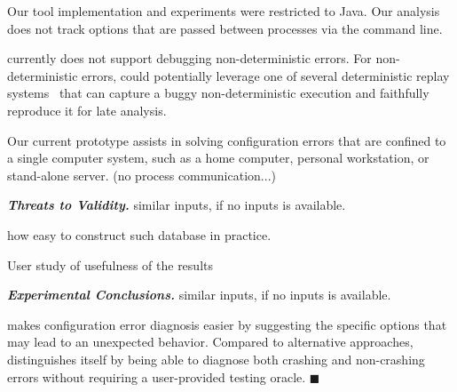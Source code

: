 Our tool implementation and experiments were restricted to Java. Our analysis
does not track options that are passed between processes via the command line.

\ourtool currently does not support debugging non-deterministic errors. %
For non-deterministic errors, \ourtool could potentially leverage one of
several deterministic replay systems~\cite{Huang:2010:LLD}
that can capture a buggy non-deterministic
execution and faithfully reproduce it for late analysis.

Our current \ourtool prototype assists in solving configuration errors that are confined
to a single computer system, such as a home computer, personal workstation, or stand-alone server. (no process communication...)

\vspace{1mm}

\noindent \textbf{\textit{Threats to Validity.}} similar inputs, if no inputs is available.

how easy to construct such database in practice.

User study of usefulness of the results

\vspace{1mm}

\noindent \textbf{\textit{Experimental Conclusions.}} similar inputs, if no inputs is available.

\ourtool makes configuration error diagnosis easier by suggesting
the specific options that may lead to an unexpected behavior. Compared to
alternative approaches, \ourtool distinguishes itself by being able to
diagnose both crashing and non-crashing errors without requiring
a user-provided testing oracle. $\blacksquare$
